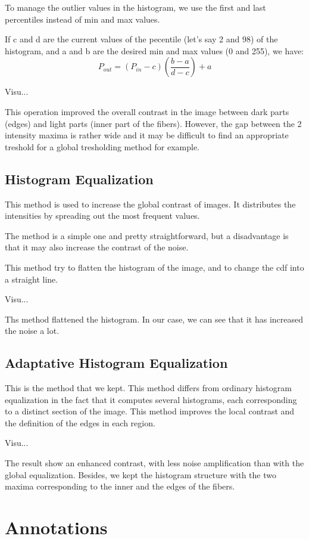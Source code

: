 \documentclass{report}
\begin{document}
To manage the outlier values in the histogram, we use the first and last percentiles instead of min and max values.

If c and d are the current values of the pecentile (let's say 2 and 98) of the histogram, and a and b are the desired min and max values (0 and 255), we have:
$$ P_{out} = (P_{in}-c)(\frac{b-a}{d-c})+a $$


Visu...

This operation improved the overall contrast in the image between dark parts (edges) and light parts (inner part of the fibers).  
However, the gap between the 2 intensity maxima is rather wide and it may be difficult to find an appropriate treshold for a global tresholding method for example.

\subsection{Histogram Equalization}

This method is used to increase the global contrast of images. It distributes the intensities by spreading out the most frequent values.

The method is a simple one and pretty straightforward, but a disadvantage is that it may also increase the contrast of the noise.

This method try to flatten the histogram of the image, and to change the cdf into a straight line.

Visu...

Ths method flattened the histogram.  
In our case, we can see that it has increased the noise a lot.

\subsection{Adaptative Histogram Equalization}
This is the method that we kept.
This method differs from ordinary histogram equalization in the fact that it computes several histograms, each corresponding to a distinct section of the image.  
This method improves the local contrast and the definition of the edges in each region.

Visu...

The result show an enhanced contrast, with less noise amplification than with the global equalization.  
Besides, we kept the histogram structure with the two maxima corresponding to the inner and the edges of the fibers.


\section{Annotations}
\end{document}

